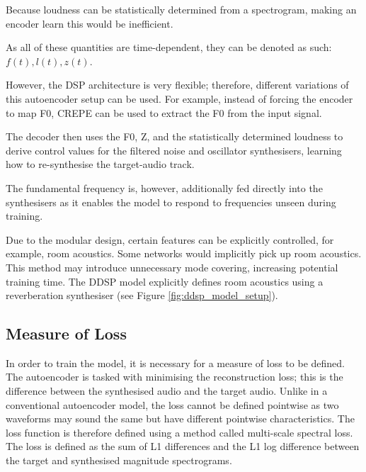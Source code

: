 Because loudness can be statistically determined from a spectrogram, making an encoder learn this would be inefficient.

As all of these quantities are time-dependent, they can be denoted as such: $f(t), l(t), z(t)$.

However, the DSP architecture is very flexible; therefore, different variations of this autoencoder setup can be used. For example, instead of forcing the encoder to map F0, CREPE can be used to extract the F0 from the input signal.

\vspace{0.5cm}
\vspace{0.5cm}

The decoder then uses the F0, Z, and the statistically determined loudness to derive control values for the filtered noise and oscillator synthesisers, learning how to re-synthesise the target-audio track.

The fundamental frequency is, however, additionally fed directly into the synthesisers as it enables the model to respond to frequencies unseen during training\cite{SingingDDSP}.

Due to the modular design, certain features can be explicitly controlled, for example, room acoustics. Some networks would implicitly pick up room acoustics. This method may introduce unnecessary mode covering, increasing potential training time. The DDSP model explicitly defines room acoustics using a reverberation synthesiser (see Figure \ref{fig:ddsp_model_setup}).

\subsection{Measure of Loss}
\label{sec:loss_measure}

In order to train the model, it is necessary for a measure of loss to be defined. The autoencoder is tasked with minimising the reconstruction loss; this is the difference between the synthesised audio and the target audio. Unlike in a conventional autoencoder model, the loss cannot be defined pointwise as two waveforms may sound the same but have different pointwise characteristics. The loss function is therefore defined using a method called multi-scale spectral loss. The loss is defined as the sum of L1 differences and the L1 log difference between the target and synthesised magnitude spectrograms.

